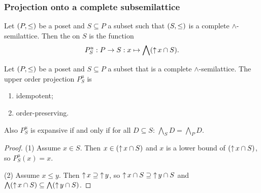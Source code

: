 \subsubsection{Projection onto a complete subsemilattice}
\begin{definition}
Let $\left( P,\leq \right)$ be a poset and $S\subseteq P$ a subset such that $\left( S,\leq \right)$ is a complete $\wedge$-semilattice. Then the  on $S$ is the function
\[ P_S^u: P \to S: x\mapsto \bigwedge(\operatorname{\uparrow} x\cap S). \]
\end{definition}

\begin{lemma}
Let $\left( P,\leq \right)$ be a poset and $S\subseteq P$ a subset that is a complete $\wedge$-semilattice. The upper order projection $P_S^u$ is
\begin{enumerate}
\item idempotent;
\item order-preserving.
\end{enumerate}
Also $P_S^u$ is expansive \textup{if and only if} for all $D\subseteq S$: $\bigwedge_S D = \bigwedge_P D$.
\end{lemma}
\begin{proof}
(1) Assume $x\in S$. Then $x\in (\operatorname{\uparrow} x \cap S)$ and $x$ is a lower bound of $(\operatorname{\uparrow} x \cap S)$, so $P_S^u(x) = x$.

(2) Assume $x \leq y$. Then $\operatorname{\uparrow} x \supseteq \operatorname{\uparrow} y$, so $\operatorname{\uparrow} x\cap S \supseteq \operatorname{\uparrow} y\cap S$ and $\bigwedge(\operatorname{\uparrow} x\cap S) \subseteq \bigwedge(\operatorname{\uparrow} y\cap S)$.


\end{proof}

